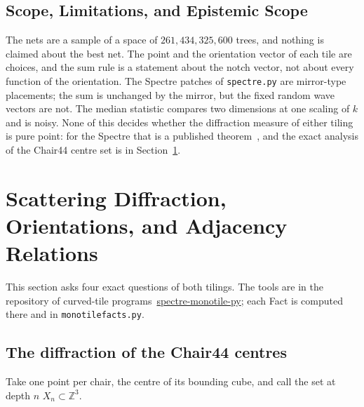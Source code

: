 \documentclass[11pt]{article}
\theoremstyle{definition}
\theoremstyle{remark}
\newcommand{\code}[1]{\texttt{#1}}
\begin{document}
\subsection{Scope, Limitations, and Epistemic Scope}

The nets are a sample of a space of $261{,}434{,}325{,}600$ trees, and nothing is claimed about the best net.  The point and the orientation
vector of each tile are choices, and the sum rule is a statement about the notch vector, not about every function of the
orientation.  The Spectre patches of \code{spectre.py} are mirror-type placements; the sum is unchanged by the mirror, but the
fixed random wave vectors are not.  The median statistic compares two dimensions at one scaling of $k$ and is noisy.  None of
this decides whether the diffraction measure of either tiling is pure point: for the Spectre that is a published
theorem~\cite{BaakeHat,BaakeSpectre}, and the exact analysis of the Chair44 centre set is in Section~\ref{sec:exact}.


\section{Scattering Diffraction, Orientations, and Adjacency Relations}
\label{sec:exact}

This section asks four exact questions of both tilings.  The tools are in the repository of curved-tile
programs~\href{https://github.com/brentharts/spectre-monotile-py}{spectre-monotile-py}; each Fact is computed there and in \code{monotilefacts.py}.

\subsection{The diffraction of the Chair44 centres}

Take one point per chair, the centre of its bounding cube, and call the set at depth $n$ $X_{n}\subset\mathbb{Z}^{3}$.
\end{document}
